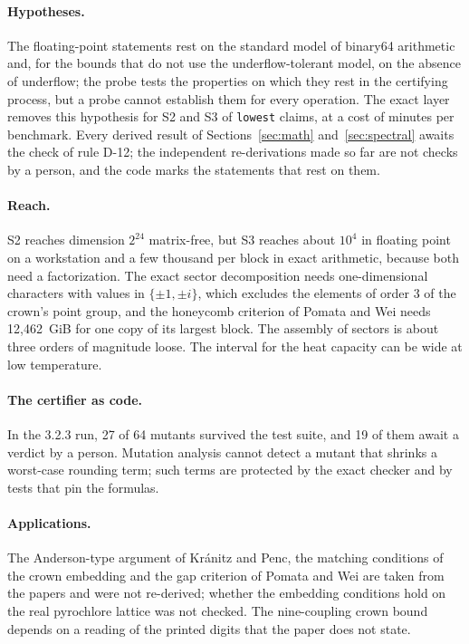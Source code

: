 \documentclass[11pt,a4paper]{article}
\newcommand{\code}[1]{\texttt{#1}}
\begin{document}
\paragraph{Hypotheses.}
The floating-point statements rest on the standard model of binary64 arithmetic and, for the bounds that do not use
the underflow-tolerant model, on the absence of underflow; the probe tests the properties on which they rest in the
certifying process, but a probe cannot establish them for every operation. The exact layer removes this hypothesis for
S2 and S3 of \code{lowest} claims, at a cost of minutes per benchmark. Every derived result of
Sections~\ref{sec:math} and~\ref{sec:spectral} awaits the check of rule D-12; the independent re-derivations made so far
are not checks by a person, and the code marks the statements that rest on them.

\paragraph{Reach.}
S2 reaches dimension $2^{24}$ matrix-free, but S3 reaches about $10^4$ in floating point on a workstation and a few
thousand per block in exact arithmetic, because both need a factorization. The exact sector decomposition needs
one-dimensional characters with values in $\{\pm1,\pm i\}$, which excludes the elements of order 3 of the crown's
point group, and the honeycomb criterion of Pomata and Wei needs 12,462~GiB for one copy of its largest block. The
assembly of sectors is about three orders of magnitude loose. The interval for the heat capacity can be wide at low
temperature.

\paragraph{The certifier as code.}
In the 3.2.3 run, 27 of 64 mutants survived the test suite, and 19 of them await a verdict by a person. Mutation
analysis cannot detect a mutant that shrinks a worst-case rounding term; such terms are protected by the exact checker
and by tests that pin the formulas.

\paragraph{Applications.}
The Anderson-type argument of Kr\'anitz and Penc, the matching conditions of the crown embedding and the gap criterion
of Pomata and Wei are taken from the papers and were not re-derived; whether the embedding conditions hold on the real
pyrochlore lattice was not checked. The nine-coupling crown bound depends on a reading of the printed digits that the
paper does not state.
\end{document}
